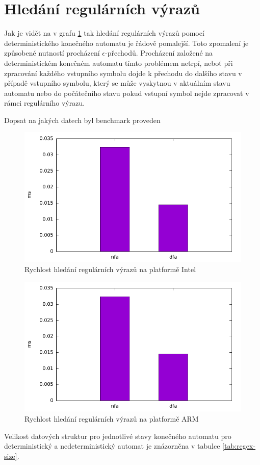\section{Hledání regulárních výrazů} %

Jak je vidět na v grafu \ref{fig:regex} tak hledání regulárních výrazů pomocí deterministického
konečného automatu je řádově pomalejší. Toto zpomalení je způsobené nutností procházení $\epsilon$-přechodů.
Procházení založené na deterministickém konečném automatu tímto problémem netrpí,
neboť při zpracování každého vstupního symbolu dojde k přechodu do dalšího stavu v případě
vstupního symbolu, který se může vyskytnou v aktuálním stavu automatu nebo do počátečního stavu
pokud vstupní symbol nejde zpracovat v rámci regulárního výrazu.

Dopsat na jakých datech byl benchmark proveden

\begin{figure}[!htbp]
	\centering
	\includegraphics[scale=0.7]{fig/regex.pdf}
	\caption{Rychlost hledání regulárních výrazů na platformě Intel}
    \label{fig:regex}
\end{figure}


\begin{figure}[!htbp]
    \centering
    \includegraphics[scale=0.7]{fig/regex.pdf}
    \caption{Rychlost hledání regulárních výrazů na platformě ARM}
    \label{fig:regex-arm}
\end{figure}
Velikost datových struktur pro jednotlivé stavy konečného automatu pro deterministický a nedeterministický
automat je znázorněna v tabulce \ref{tab:regex-size}.

